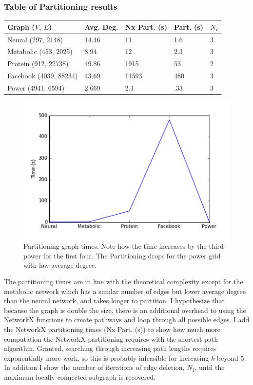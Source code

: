 \documentclass{article}
\begin{document}
\subsubsection{Table of Partitioning results} 
\begin{spacing}{1}
\begin{center}
\renewcommand{\arraystretch}{1.5}
    \begin{tabular}{| l | l | l | l | l |}
    \hline
    Graph ($V$, $E$) & Avg. Deg. & Nx Part. (s) & Part. (s) & $N_I$ \\ \hline
    Neural (297, 2148) & 14.46 & 11 & 1.6 & 3 \\ \hline
    Metabolic (453, 2025) & 8.94 & 12 & 2.3 & 3 \\  \hline
    Protein (912, 22738) & 49.86 & 1915 & 53 & 2 \\ \hline
    Facebook (4039, 88234) & 43.69 & 11593 & 480 & 3 \\ \hline
    Power (4941, 6594) & 2.669 & 2.1 & .33 & 3 \\ 
    \hline
    \end{tabular}
\end{center}
\end{spacing}

\begin{figure}[H]
\centering
\includegraphics[width = \linewidth]{ptimes.png}
\caption{Partitioning graph times. Note how the time increases by the third power for the first four. The Partitioning drops for the power grid with low average degree.}
\end{figure}

The partitioning times are in line with the theoretical complexity except for the metabolic network which has a similar number of edges but lower average degree than the neural network, and takes longer to partition. I hypothesize that because the graph is double the size, there is an additional overhead to using the NetworkX functions to create pathways and loop through all possible edges. I add the NetworkX partitioning times (Nx Part. (s)) to show how much more computation the NetworkX partitioning requires with the shortest path algorithm. Granted, searching through increasing path lengths requires exponentially more work, so this is probably infeasible for increasing $k$ beyond 5. In addition I show the number of iterations of edge deletion, $N_I$, until the maximum locally-connected subgraph is recovered.
\end{document}
